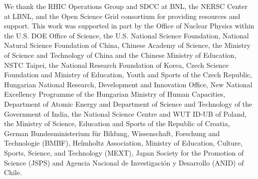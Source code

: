 
We thank the RHIC Operations Group and SDCC at BNL, the NERSC Center at LBNL, and the Open Science Grid consortium for providing resources and support.  This work was supported in part by the Office of Nuclear Physics within the U.S. DOE Office of Science, the U.S. National Science Foundation, National Natural Science Foundation of China, Chinese Academy of Science, the Ministry of Science and Technology of China and the Chinese Ministry of Education, NSTC Taipei, the National Research Foundation of Korea, Czech Science Foundation and Ministry of Education, Youth and Sports of the Czech Republic, Hungarian National Research, Development and Innovation Office, New National Excellency Programme of the Hungarian Ministry of Human Capacities, Department of Atomic Energy and Department of Science and Technology of the Government of India, the National Science Centre and WUT ID-UB of Poland, the Ministry of Science, Education and Sports of the Republic of Croatia, German Bundesministerium f\"ur Bildung, Wissenschaft, Forschung and Technologie (BMBF), Helmholtz Association, Ministry of Education, Culture, Sports, Science, and Technology (MEXT), Japan Society for the Promotion of Science (JSPS) and Agencia Nacional de Investigaci\'on y Desarrollo (ANID) of Chile.